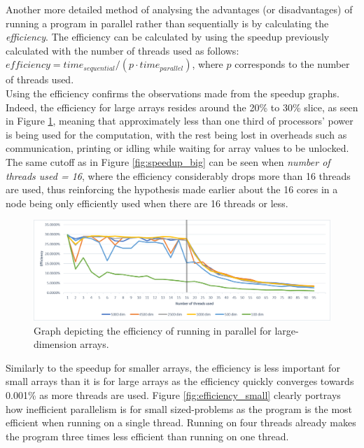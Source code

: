 \documentclass[letterpaper,12pt]{article}
\begin{document}
Another more detailed method of analysing the advantages (or disadvantages) of running a program in parallel rather than sequentially is by calculating the \textit{efficiency}. The efficiency can be calculated by using the speedup previously calculated with the number of threads used as follows: $efficiency = time_{sequential} / (p \cdot time_{parallel})$, where $p$ corresponds to the number of threads used.\\

Using the efficiency confirms the observations made from the speedup graphs. Indeed, the efficiency for large arrays resides around the 20\% to 30\% slice, as seen in Figure \ref{fig:efficiency_big}, meaning that approximately less than one third of processors' power is being used for the computation, with the rest being lost in overheads such as communication, printing or idling while waiting for array values to be unlocked. The same cutoff as in Figure \ref{fig:speedup_big} can be seen when \textit{number of threads used = 16}, where the efficiency considerably drops more than 16 threads are used, thus reinforcing the hypothesis made earlier about the 16 cores in a node being only efficiently used when there are 16 threads or less.\\

\begin{figure}[h]
\centerline{\includegraphics[width=\textwidth]{report/plots/efficiency_big.png}}
\caption{\label{fig:efficiency_big}Graph depicting the efficiency of running in parallel for large-dimension arrays.}
\end{figure}

Similarly to the speedup for smaller arrays, the efficiency is less important for small arrays than it is for large arrays as the efficiency quickly converges towards 0.001\% as more threads are used. Figure \ref{fig:efficiency_small} clearly portrays how inefficient parallelism is for small sized-problems as the program is the most efficient when running on a single thread. Running on four threads already makes the program three times less efficient than running on one thread.\\
\end{document}
